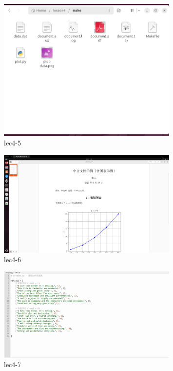 \documentclass[a4paper, 12pt]{article}
\begin{document}
\begin{figure}[htbp]
    \centering
    \includegraphics[width=0.8\textwidth]{lec4 (5).png}
    \caption{lec4-5}
    \label{fig:train}
\end{figure}

\begin{figure}[htbp]
    \centering
    \includegraphics[width=0.8\textwidth]{lec4 (6).png}
    \caption{lec4-6}
\end{figure}

\begin{figure}[htbp]
    \centering
    \includegraphics[width=0.8\textwidth]{lec4 (7).png}
    \caption{lec4-7}
\end{figure}
\end{document}
